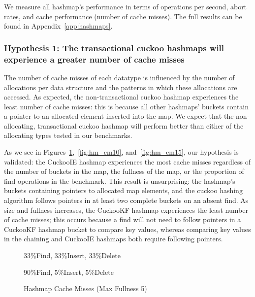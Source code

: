 We measure all hashmap's performance in terms of operations per second, abort rates, and cache performance (number of cache misses). 
The full results can be found in Appendix~\ref{app:hashmaps}.

\subsubsection{Hypothesis 1: The transactional cuckoo hashmaps will experience a greater number of cache misses}

The number of cache misses of each datatype is influenced by the number of allocations per data structure and the patterns in which these allocations are accessed. As expected, the non-transactional cuckoo hashmap experiences the least number of cache misses: this is because all other hashmaps' buckets contain a pointer to an allocated element inserted into the map. We expect that the non-allocating, transactional cuckoo hashmap will perform better than either of the allocating types tested in our benchmarks.

As we see in Figures~\ref{fig:hm_cm5},~\ref{fig:hm_cm10}, and~\ref{fig:hm_cm15}, our hypothesis is validated: the CuckooIE hashmap experiences the most cache misses regardless of the number of buckets in the map, the fullness of the map, or the proportion of find operations in the benchmark. This result is unsurprising: the hashmap's buckets containing pointers to allocated map elements, and the cuckoo hashing algorithm follows pointers in at least two complete buckets on an absent find. As size and fullness increases, the CuckooKF hashmap experiences the least number of cache misses; this occurs because a find will not need to follow pointers in a CuckooKF hashmap bucket to compare key values, whereas comparing key values in the chaining and CuckooIE hashmaps both require following pointers.

    \begin{figure}[H]
    \centering
        \begin{minipage}{0.75\textwidth}
        \centering
            \caption*{33\%Find, 33\%Insert, 33\%Delete}
            \vspace{12pt}
        \end{minipage}
        \begin{minipage}{0.75\textwidth}
            \centering
            \caption*{90\%Find, 5\%Insert, 5\%Delete}
        \end{minipage}
        \caption{Hashmap Cache Misses (Max Fullness 5)}
		\label{fig:hm_cm5}
    \end{figure}

